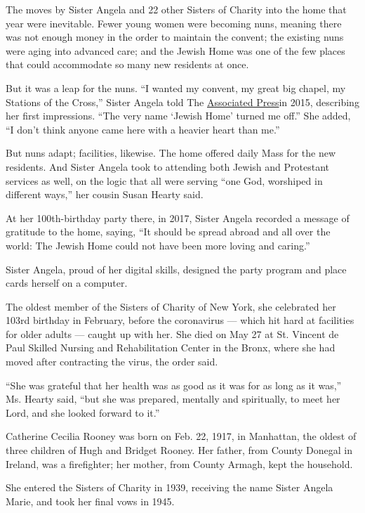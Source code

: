 The moves by Sister Angela and 22 other Sisters of Charity into the home
that year were inevitable. Fewer young women were becoming nuns, meaning
there was not enough money in the order to maintain the convent; the
existing nuns were aging into advanced care; and the Jewish Home was one
of the few places that could accommodate so many new residents at once.

But it was a leap for the nuns. ``I wanted my convent, my great big
chapel, my Stations of the Cross,'' Sister Angela told The
\href{https://www.nbcnewyork.com/news/local/aging-catholic-nuns-find-care-at-jewish-nursing-home/1336427/}{Associated
Press}in 2015, describing her first impressions. ``The very name `Jewish
Home' turned me off.'' She added, ``I don't think anyone came here with
a heavier heart than me.''

But nuns adapt; facilities, likewise. The home offered daily Mass for
the new residents. And Sister Angela took to attending both Jewish and
Protestant services as well, on the logic that all were serving ``one
God, worshiped in different ways,'' her cousin Susan Hearty said.

At her 100th-birthday party there, in 2017, Sister Angela recorded a
message of gratitude to the home, saying, ``It should be spread abroad
and all over the world: The Jewish Home could not have been more loving
and caring.''

Sister Angela, proud of her digital skills, designed the party program
and place cards herself on a computer.

The oldest member of the Sisters of Charity of New York, she celebrated
her 103rd birthday in February, before the coronavirus --- which hit
hard at facilities for older adults --- caught up with her. She died on
May 27 at St. Vincent de Paul Skilled Nursing and Rehabilitation Center
in the Bronx, where she had moved after contracting the virus, the order
said.

``She was grateful that her health was as good as it was for as long as
it was,'' Ms. Hearty said, ``but she was prepared, mentally and
spiritually, to meet her Lord, and she looked forward to it.''

Catherine Cecilia Rooney was born on Feb. 22, 1917, in Manhattan, the
oldest of three children of Hugh and Bridget Rooney. Her father, from
County Donegal in Ireland, was a firefighter; her mother, from County
Armagh, kept the household.

She entered the Sisters of Charity in 1939, receiving the name Sister
Angela Marie, and took her final vows in 1945.


